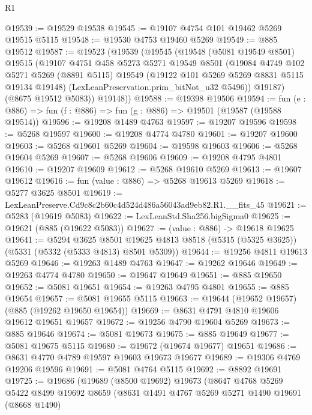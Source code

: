 \begin{lexlean}{R1}
\begin{coremodule}
@19539 := @19529 @19538
@19545 := @19107 @4754 @101 @19462 @5269 @19515 @5115
@19548 := @19530 @4753 @19460 @5269
@19549 := @885 @19512
@19587 := @19523
    (@19539
      (@19545
        (@19548
          (@5081 @19549 @8501)
          @19515
          (@19107
            @4751
            @458
            @5273
            @5271
            @19549
            @8501
            (@19084
              @4749
              @102
              @5271
              @5269
              (@8891 @5115)
              @19549
              (@19122 @101 @5269 @5269 @8831 @5115 @19134 @19148)
              (LexLeanPreservation.prim_bitNot_u32 @5496))
            @19187)
          (@8675 @19512 @5083))
        @19148))
@19588 := @19398 @19506
@19594 := fun (e : @886) => fun (f : @886) => fun (g : @886) => @19501 (@19587 (@19588 @19514))
@19596 := @19208 @1489 @4763
@19597 := @19207 @19596
@19598 := @5268 @19597
@19600 := @19208 @4774 @4780
@19601 := @19207 @19600
@19603 := @5268 @19601 @5269
@19604 := @19598 @19603
@19606 := @5268 @19604 @5269
@19607 := @5268 @19606
@19609 := @19208 @4795 @4801
@19610 := @19207 @19609
@19612 := @5268 @19610 @5269
@19613 := @19607 @19612
@19616 := fun (value : @886) => @5268 @19613 @5269
@19618 := @5277 @3625 @8501
@19619 := LexLeanPreserve.Cd9c8c2b60c4d524d486a56043ad9eb82.R1.__fits_45
@19621 := @5283 (@19619 @5083)
@19622 := LexLeanStd.Sha256.bigSigma0
@19625 := @19621 (@885 (@19622 @5083))
@19627 := (value : @886) -> @19618 @19625
@19641 := @5294
    @3625
    @8501
    @19625
    @4813
    @8518
    (@5315 (@5325 @3625))
    (@5331 (@5332 (@5333 @4813) @8501 @5309))
@19644 := @19256 @4811 @19613 @5269
@19646 := @19263 @1489 @4763
@19647 := @19262 @19646
@19649 := @19263 @4774 @4780
@19650 := @19647 @19649
@19651 := @885 @19650
@19652 := @5081 @19651
@19654 := @19263 @4795 @4801
@19655 := @885 @19654
@19657 := @5081 @19655 @5115
@19663 := @19644 (@19652 @19657) (@885 (@19262 @19650 @19654))
@19669 := @8631 @4791 @4810 @19606 @19612 @19651 @19657
@19672 := @19256 @4790 @19604 @5269
@19673 := @885 @19646
@19674 := @5081 @19673
@19675 := @885 @19649
@19677 := @5081 @19675 @5115
@19680 := @19672 (@19674 @19677) @19651
@19686 := @8631 @4770 @4789 @19597 @19603 @19673 @19677
@19689 := @19306 @4769 @19206 @19596
@19691 := @5081 @4764 @5115
@19692 := @8892 @19691
@19725 := @19686
    (@19689
      (@8500 @19692)
      @19673
      (@8647
        @4768
        @5269
        @5422
        @8499
        @19692
        @8659
        (@8631
          @1491
          @4767
          @5269
          @5271
          @1490
          @19691
          (@8668 @1490)

\end{coremodule}
\end{lexlean}
